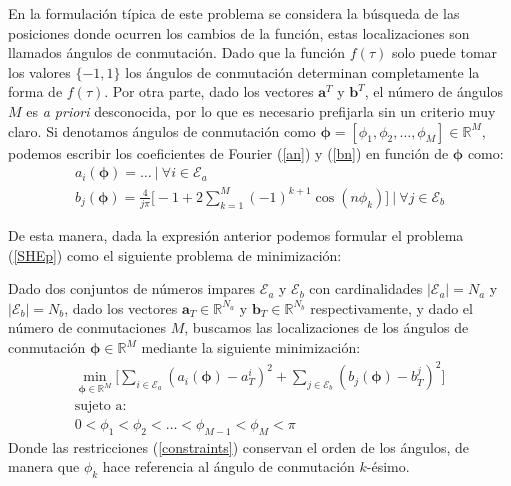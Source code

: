 En la formulación típica de este problema se considera la búsqueda de las posiciones donde ocurren los cambios de la función, estas localizaciones son llamados ángulos de conmutación. Dado que la función $f(\tau)$ solo puede tomar los valores $\{-1,1\}$ los ángulos de conmutación determinan completamente la forma de $f(\tau)$.
%
Por otra parte, dado los vectores $\bm{a}^T$ y $\bm{b}^T$, el número de ángulos $M$ es \emph{a priori} desconocida, por lo que es necesario prefijarla sin un criterio muy claro.
%
Si denotamos ángulos de conmutación como $\bm{\phi} = [\phi_1,\phi_2,\dots,\phi_M] \in \mathbb{R}^M $,  podemos escribir los coeficientes de Fourier (\ref{an}) y (\ref{bn}) en función de $\bm{\phi}$ como: 
\begin{gather}
    a_i(\bm{\phi})  = \dots  \ | \ \forall i \in \mathcal{E}_a \\
    b_j(\bm{\phi})  =  \frac{4}{j\pi  } \bigg[ -1 + 2\sum_{k=1}^M  (-1)^{k+1}\cos(n\phi_k) \bigg] \ | \ \forall j \in \mathcal{E}_b
\end{gather}

De esta manera, dada la expresión anterior podemos formular el problema (\ref{SHEp}) como el siguiente problema de minimización:

\begin{problem}\label{SHEp_clas}
    Dado dos conjuntos de números impares $\mathcal{E}_a$ y $\mathcal{E}_b$ con cardinalidades $|\mathcal{E}_a| = N_a$ y  $|\mathcal{E}_b| = N_b$,  dado los vectores $\bm{a}_T  \in \mathbb{R}^{N_a}$ y $\bm{b}_T  \in \mathbb{R}^{N_b}$ respectivamente, y dado el número de conmutaciones $M$, buscamos las localizaciones de los ángulos de conmutación $\bm{\phi} \in \mathbb{R}^M$ mediante la siguiente minimización:
    \begin{gather}
        \min_{\bm{\phi} \in \mathbb{R}^M} \Big[
        \sum_{i \in \mathcal{E}_a} (a_i(\bm{\phi}) - a^i_T)^2 + 
        \sum_{j \in \mathcal{E}_b} (b_j(\bm{\phi}) - b^j_T)^2  
        \Big] \\
        \text{sujeto a:} \\ 
            0 < \phi_1  < \phi_2 < \dots  < \phi_{M-1}  <   \phi_{M} < \pi
        \label{constraints}
    \end{gather} 
    Donde las restricciones (\ref{constraints})  conservan el orden de los ángulos, de manera que $\phi_k$ hace referencia al ángulo de conmutación $k$-ésimo. 
    
\end{problem}

